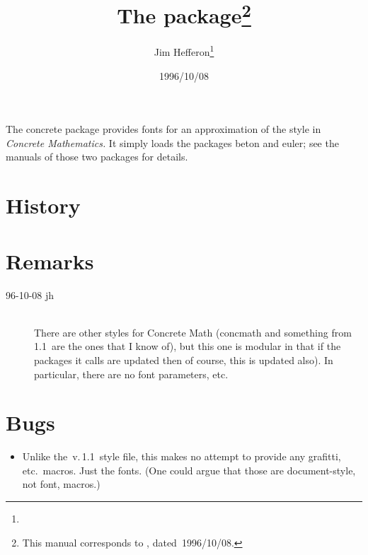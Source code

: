 \documentclass[pagesize=auto, fontsize=12pt, DIV=10]{scrartcl}
\title{The \pkg{concrete} package\thanks{This manual corresponds to \pkg{concrete.sty}, dated~1996/10/08.}}
\author{Jim Hefferon\thanks{\mail{jhefferon@smcvt.edu}}}
\date{1996/10/08}
\makeatletter
\newcommand*{\mail}[1]{\href{mailto:#1}{\texttt{#1}}}
\newcommand*{\pkg}[1]{\textsf{#1}}
\newcommand*{\cs}[1]{\texttt{\textbackslash#1}}
\newcommand*{\cmd}[1]{\cs{\expandafter\@gobble\string#1}}
\makeatother
\begin{document}
\maketitle

\noindent
The \pkg{concrete} package provides fonts for an approximation of the style in \emph{Concrete Mathematics.}
It simply loads the packages \pkg{beton} and \pkg{euler}; see the manuals of those two packages for details.


\section{History}



\section{Remarks}

\begin{description}
\item[96-10-08 jh] \leavevmode \\
  There are other styles for Concrete Math (\pkg{concmath} and something
  from \,1.1\ are the ones that I know of), but this one is
  modular in that if the packages it calls are updated then of
  course, this is updated also).  In particular, there are no font 
  parameters, etc.
\end{description}


\section{Bugs}

\begin{itemize}
\item Unlike the \,v.\,1.1\ style file, this makes no attempt to
  provide any grafitti, etc.\ macros.  Just the fonts.  (One could
  argue that those are document-style, not font, macros.)
\end{itemize}
\end{document}
